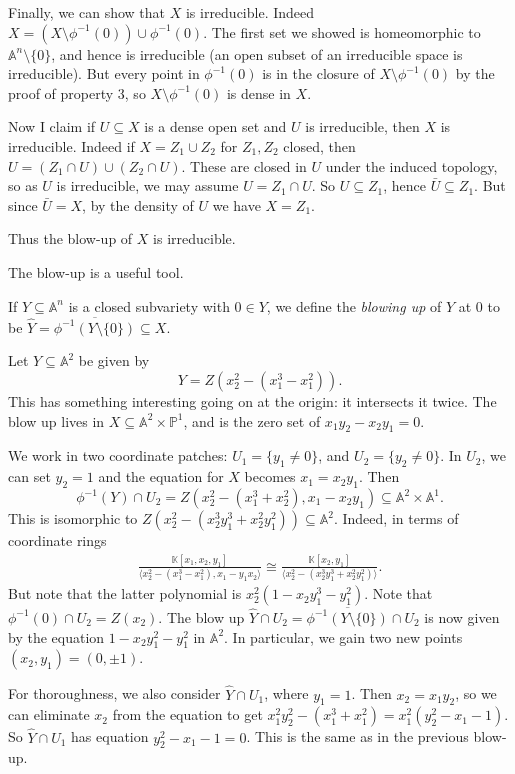 \documentclass[12pt]{article}
\begin{document}
\begin{exbox}
	Finally, we can show that $X$ is irreducible. Indeed $X = (X \setminus \phi^{-1}(0)) \cup \phi^{-1}(0)$. The first set we showed is homeomorphic to $\mathbb{A}^n \setminus \{0\}$, and hence is irreducible (an open subset of an irreducible space is irreducible). But every point in $\phi^{-1}(0)$ is in the closure of $X \setminus \phi^{-1}(0)$ by the proof of property 3, so $X \setminus \phi^{-1}(0)$ is dense in $X$.

	Now I claim if $U \subseteq X$ is a dense open set and $U$ is irreducible, then $X$ is irreducible. Indeed if $X = Z_1 \cup Z_2$ for $Z_1, Z_2$ closed, then $U = (Z_1 \cap U) \cup (Z_2 \cap U)$. These are closed in $U$ under the induced topology, so as $U$ is irreducible, we may assume $U = Z_1 \cap U$. So $U \subseteq Z_1$, hence $\bar U \subseteq Z_1$. But since $\bar U = X$, by the density of $U$ we have $X = Z_1$.

	Thus the blow-up of $X$ is irreducible.
\end{exbox}

The blow-up is a useful tool.

\begin{definition}
	If $Y \subseteq \mathbb{A}^n$ is a closed subvariety with $0 \in Y$, we define the \emph{blowing up} of $Y$ at $0$ to be $\hat Y = \overline{\phi^{-1}(Y \setminus \{0\})} \subseteq X$.
\end{definition}

\begin{exbox}
	Let $Y \subseteq \mathbb{A}^2$ be given by
	\[
	Y = Z(x_2^2 - (x_1^3 - x_1^2)).
	\]
	This has something interesting going on at the origin: it intersects it twice. The blow up lives in $X \subseteq \mathbb{A}^2 \times \mathbb{P}^1$, and is the zero set of $x_1y_2 - x_2y_1 = 0$.

	We work in two coordinate patches: $U_1 = \{y_1 \neq 0\}$, and $U_2 = \{y_2 \neq 0\}$. In $U_2$, we can set $y_2 = 1$ and the equation for $X$ becomes $x_1 = x_2 y_1$. Then
	\[
	\phi^{-1}(Y) \cap U_2 = Z(x_2^2 - (x_1^3+x_2^2),x_1-x_2y_1) \subseteq \mathbb{A}^2 \times \mathbb{A}^1.
	\]
	This is isomorphic to $Z(x_2^2 - (x_2^3y_1^3 + x_2^2y_1^2)) \subseteq \mathbb{A}^2$. Indeed, in terms of coordinate rings
	\begin{align*}
		\frac{\mathbb{K}[x_1, x_2, y_1]}{\langle x_2^2 - (x_1^3 - x_1^2), x_1 - y_1x_2\rangle} \cong \frac{\mathbb{K}[x_2, y_1]}{\langle x_2^2 - (x_2^3y_1^3 + x_2^2y_1^2)\rangle}.
	\end{align*}
	But note that the latter polynomial is $x_2^2(1 - x_2y_1^3 - y_1^2).$ Note that $\phi^{-1}(0) \cap U_2 = Z(x_2)$. The blow up $\hat Y \cap U_2 = \overline{\phi^{-1}(Y \setminus \{0\})} \cap U_2$ is now given by the equation $1 - x_2 y_1^2 - y_1^2$ in $\mathbb{A}^2$. In particular, we gain two new points $(x_2, y_1) = (0, \pm 1)$.

	For thoroughness, we also consider $\hat Y \cap U_1$, where $y_1 = 1$. Then $x_2 = x_1 y_2$, so we can eliminate $x_2$ from the equation to get $x_1^2y_2^2 - (x_1^3 + x_1^2) = x_1^2(y_2^2 - x_1 - 1)$. So $\hat Y \cap U_1$ has equation $y_2^2 - x_1 - 1 = 0$. This is the same as in the previous blow-up.
\end{exbox}
\end{document}
